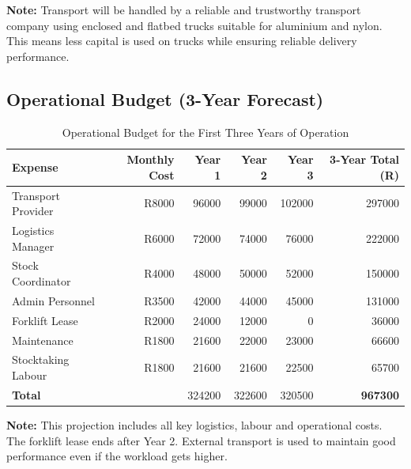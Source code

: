 \vspace{1em}
\noindent\textbf{Note:} Transport will be handled by a reliable and trustworthy transport company using enclosed and flatbed trucks suitable for aluminium and nylon. This means less capital is used on trucks while ensuring reliable delivery performance.

\subsection{Operational Budget (3-Year Forecast)}

\begin{table}[H]
\centering
\caption{Operational Budget for the First Three Years of Operation}
\renewcommand{\arraystretch}{1.4}
\begin{tabular}{|p{4cm}|r|r|r|r|r|}
\hline
\textbf{Expense} & \textbf{Monthly Cost} & \textbf{Year 1} & \textbf{Year 2} & \textbf{Year 3} & \textbf{3-Year Total (R)} \\
\hline
Transport Provider & R8000 & 96000 & 99000 & 102000 & 297000 \\
Logistics Manager & R6000 & 72000 & 74000 & 76000 & 222000 \\
Stock Coordinator & R4000 & 48000 & 50000 & 52000 & 150000 \\
Admin Personnel & R3500 & 42000 & 44000 & 45000 & 131000 \\
Forklift Lease & R2000 & 24000 & 12000 & 0 & 36000 \\
Maintenance & R1800 & 21600 & 22000 & 23000 & 66600 \\
Stocktaking Labour & R1800 & 21600 & 21600 & 22500 & 65700 \\
\hline
\textbf{Total} &  & 324200 & 322600 & 320500 & \textbf{967300} \\
\hline
\end{tabular}
\end{table}

\vspace{1em}
\noindent\textbf{Note:} This projection includes all key logistics, labour and operational costs. The forklift lease ends after Year 2. External transport is used to maintain good performance even if the workload gets higher.
